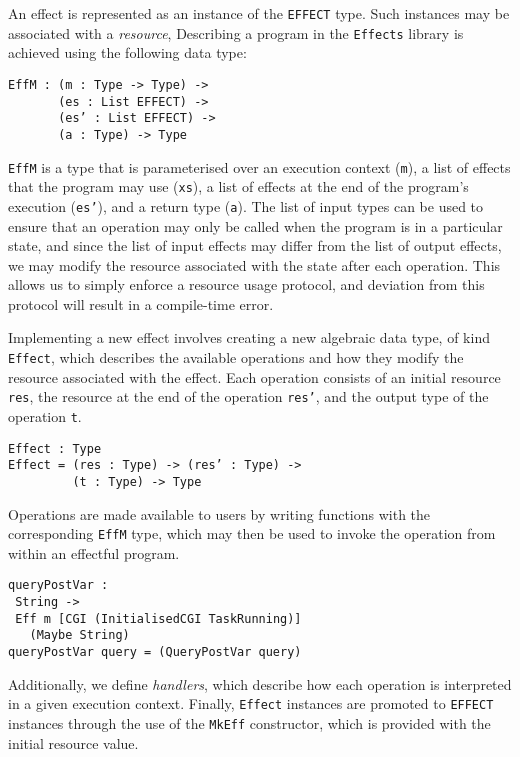 \documentclass[preprint]{sigplanconf}
\begin{document}
An effect is represented as an instance of the \texttt{EFFECT} type. Such instances may be associated with a \textit{resource}, 
Describing a program in the \texttt{Effects} library is achieved using the following data type:
{\small
\begin{verbatim}
EffM : (m : Type -> Type) ->
       (es : List EFFECT) ->
       (es’ : List EFFECT) ->
       (a : Type) -> Type
\end{verbatim}
}
\texttt{EffM} is a type that is parameterised over an execution context (\texttt{m}), a list of effects that the program may use (\texttt{xs}), a list of effects at the end of the program's execution (\texttt{es'}), and a return type (\texttt{a}). The list of input types can be used to ensure that an operation may only be called when the program is in a particular state, and since the list of input effects may differ from the list of output effects, we may modify the resource associated with the state after each operation. This allows us to simply enforce a resource usage protocol, and deviation from this protocol will result in a compile-time error.

Implementing a new effect involves creating a new algebraic data type, of kind \texttt{Effect}, which describes the available operations and how they modify the resource associated with the effect. Each operation consists of an initial resource \texttt{res}, the resource at the end of the operation \texttt{res'}, and the output type of the operation \texttt{t}.
{\small
\begin{verbatim}
Effect : Type
Effect = (res : Type) -> (res’ : Type) ->
         (t : Type) -> Type
\end{verbatim}
}
Operations are made available to users by writing functions with the corresponding \texttt{EffM} type, which may then be used to invoke the operation from within an effectful program.
{\small
\begin{verbatim}
queryPostVar : 
 String -> 
 Eff m [CGI (InitialisedCGI TaskRunning)] 
   (Maybe String)
queryPostVar query = (QueryPostVar query)
\end{verbatim}
}
Additionally, we define \textit{handlers}, which describe how each operation is interpreted in a given execution context. Finally, \texttt{Effect} instances are promoted to \texttt{EFFECT} instances through the use of the \texttt{MkEff} constructor, which is provided with the initial resource value.

\end{document}
